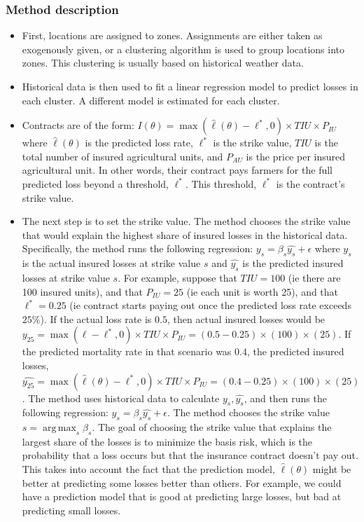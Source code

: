 \documentclass[11pt]{article}
\DeclareMathOperator*{\argmax}{arg\,max}
\begin{document}
    \subsubsection{Method description}
    \begin{itemize}
      \item First, locations are assigned to zones. Assignments are either taken as exogenously given, or a clustering algorithm is used to group locations into zones. This clustering is usually based on historical weather data.  
      \item Historical data is then used to fit a linear regression model to predict losses in each cluster. A different model is estimated for each cluster. 
      \item Contracts are of the form: $I(\theta) = \max(\hat{\ell}(\theta)-\ell^*,0)\times TIU \times P_{IU}$ where $\hat{\ell}(\theta)$ is the predicted loss rate, $\ell^*$ is the strike value, $TIU$ is the total number of insured agricultural units, and $P_{AU}$ is the price per insured agricultural unit.  In other words, their contract pays farmers for the full predicted loss beyond a threshold, $\ell^*$. This threshold, $\ell^*$ is the contract's strike value. 
      \item The next step is to set the strike value. The method chooses the strike value that would explain the highest share of insured losses in the historical data. Specifically, the method runs the following regression: $y_s = \beta_s \hat{y_s}+\epsilon$ where $y_s$ is the actual insured losses at strike value $s$ and $\hat{y_s}$ is the predicted insured losses at strike value $s$. For example, suppose that $TIU=100$ (ie there are 100 insured units), and that $P_{IU}=25$ (ie each unit is worth 25), and that $\ell^* = 0.25$ (ie contract starts paying out once the predicted loss rate exceeds $25\%$). If the actual loss rate is $0.5$, then actual insured losses would be $y_{25} = \max(\ell-\ell^*,0)\times TIU \times P_{IU} = (0.5-0.25)\times(100) \times (25)$. If the predicted mortality rate in that scenario was $0.4$, the predicted insured losses, $\hat{y_{25}} = \max(\hat{\ell}(\theta)-\ell^*,0)\times TIU \times P_{IU} = (0.4-0.25)\times(100) \times (25)$. The method uses historical data to calculate $y_s, \hat{y_s}$, and then runs the following regression: $y_s = \beta_s \hat{y_s}+\epsilon$. The method chooses the strike value $s= \argmax_s \beta_s$. The goal of choosing the strike value that explains the largest share of the losses is to minimize the basis risk, which is the probability that a loss occurs but that the insurance contract doesn't pay out. This takes into account the fact that the prediction model, $\hat{\ell}(\theta)$ might be better at predicting some losses better than others. For example, we could have a prediction model that is good at predicting large losses, but bad at predicting small losses. 
  \end{itemize}
\end{document}
